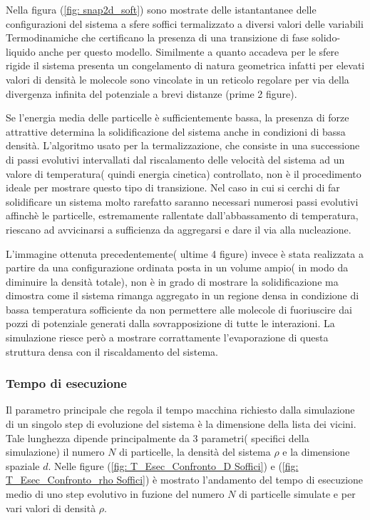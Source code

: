 Nella figura (\ref{fig: snap2d_soft}) sono mostrate delle istantantanee delle configurazioni del sistema a sfere soffici termalizzato a diversi valori delle variabili Termodinamiche che certificano la presenza di una transizione di fase solido-liquido anche per questo modello.
Similmente a quanto accadeva per le sfere rigide il sistema presenta un congelamento di natura geometrica infatti per elevati valori di densità le molecole sono vincolate in un reticolo regolare per via della divergenza infinita del potenziale a brevi distanze (prime 2 figure).

Se l'energia media delle particelle è sufficientemente bassa, la presenza di forze attrattive determina la solidificazione del sistema anche in condizioni di bassa densità.
L'algoritmo usato per la termalizzazione, che consiste in una successione di passi evolutivi intervallati dal riscalamento delle velocità del sistema ad un valore di temperatura( quindi energia cinetica) controllato, non è il procedimento ideale per mostrare questo tipo di transizione.
Nel caso in cui si cerchi di far solidificare un sistema molto rarefatto saranno necessari numerosi passi evolutivi affinchè le particelle, estremamente rallentate dall'abbassamento di temperatura, riescano ad avvicinarsi a sufficienza da aggregarsi e dare il via alla nucleazione.

L'immagine ottenuta precedentemente( ultime 4 figure) invece è stata realizzata a partire da una configurazione ordinata posta in un volume ampio( in modo da diminuire la densità totale), non è in grado di mostrare la solidificazione ma dimostra come il sistema rimanga aggregato in un regione densa in condizione di bassa temperatura sofficiente da non permettere alle molecole di fuoriuscire dai pozzi di potenziale generati dalla sovrapposizione di tutte le interazioni.
La simulazione riesce però a mostrare corrattamente l'evaporazione di questa struttura densa con il riscaldamento del sistema.

\FloatBarrier 
\subsubsection{Tempo di esecuzione}
Il parametro principale che regola il tempo macchina richiesto dalla simulazione di un singolo step di evoluzione del sistema è la dimensione della lista dei vicini. 
Tale lunghezza dipende principalmente da 3 parametri( specifici della simulazione) il numero $N$ di particelle, la densità del sistema $\rho$ e la dimensione spaziale $d$.
Nelle figure (\ref{fig: T_Esec_Confronto_D Soffici}) e (\ref{fig: T_Esec_Confronto_rho Soffici}) è mostrato l'andamento del tempo di esecuzione medio di uno step evolutivo in fuzione del numero $N$ di particelle simulate e per vari valori di densità $\rho$.

